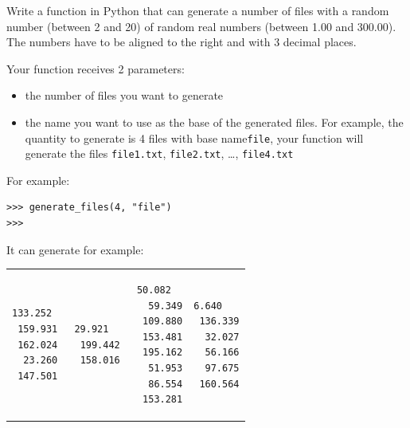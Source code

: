 \begin{exercise}
\label{generate_ficheros}
Write a function  in Python that can generate a number of files with a random number (between 2 and 20) of random real numbers (between 1.00 and 300.00). The numbers have to be aligned to the right and with 3 decimal places.


Your function receives 2 parameters:

\begin{itemize}
    \item the number of files you want to generate
    \item the name you want to use as the base of the generated files. For example, the quantity to generate is 4 files with base name\texttt{file}, your function will generate the files \texttt{file1.txt}, \texttt{file2.txt}, \dots, \texttt{file4.txt }
\end{itemize}

For example:

\begin{Verbatim}[frame=single, label={\em interactive session example}]
>>> generate_files(4, "file")
>>> 
\end{Verbatim}

It can generate for example:

\begin{tabular}{p{3cm}p{3cm}p{3cm}p{3cm}}

\begin{Verbatim}[frame=single, label={\em file1.txt}]
 133.252 
 159.931 
 162.024 
  23.260 
 147.501 
\end{Verbatim}
&
\begin{Verbatim}[frame=single, label={\em file2.txt}]
  29.921 
 199.442 
 158.016 
\end{Verbatim}
&
\begin{Verbatim}[frame=single, label={\em file3.txt}]
  50.082 
  59.349
 109.880
 153.481
 195.162
  51.953
  86.554
 153.281
\end{Verbatim}
&
\begin{Verbatim}[frame=single, label={\em file4.txt}]
   6.640
 136.339
  32.027
  56.166
  97.675
 160.564
\end{Verbatim}
\end{tabular}

\end{exercise}

